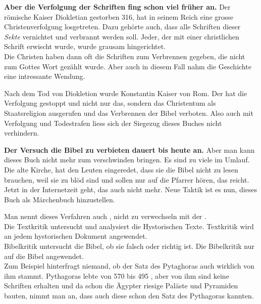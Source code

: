 \documentclass[fontsize=16pt]{mybib}
\begin{document}
\begin{otsblock}

    \textbf{Aber die Verfolgung der Schriften fing schon viel früher an.} Der römische Kaiser Diokletian gestorben 316, hat in seinem Reich eine grosse Christenverfolgung losgetreten. Dazu gehörte auch, dass alle Schriften dieser \textit{Sekte} vernichtet und verbrannt werden soll. Jeder, der mit einer christlichen Schrift erwischt wurde, wurde grausam hingerichtet. \\
    Die Christen haben dann oft die Schriften zum Verbrennen gegeben, die nicht zum Gottes Wort gezählt wurde. Aber auch in diesem Fall nahm die Geschichte eine intressante Wendung.

    Nach dem Tod von Diokletion wurde Konstantin Kaiser von Rom. Der hat die Verfolgung gestoppt und nicht nur das, sondern das Christentum als Staatsreligion ausgerufen und das Verbrennen der Bibel verboten. Also auch mit Verfolgung und Todestrafen liess sich der Siegezug dieses Buches nicht verhindern.\\
\end{otsblock}
\begin{otsblock}
    \textbf{Der Versuch die Bibel zu verbieten dauert bis heute an.} Aber man kann dieses Buch nicht mehr zum verschwinden bringen. Es sind zu viele im Umlauf. Die alte Kirche, hat den Leuten eingeredet, dass sie die Bibel nicht zu lesen brauchen, weil sie zu blöd sind und sollen nur auf die Pfarrer hören, das reicht.\\
    Jetzt in der Internetzeit geht, das auch nicht mehr. Neue Taktik ist es nun, dieses Buch als Märchenbuch hinzustellen.
    
    Man nennt dieses Verfahren auch , nicht zu verwechseln mit der .\\
    Die Textkritik untersucht und analysiert die Hystorischen Texte. Textkritik wird an jedem hystorischen Dokument angewendet.\\
    Bibelkritik untersucht die Bibel, ob sie falsch oder richtig ist. Die Bibelkritik nur auf die Bibel angewendet.\\
    Zum Beispiel hinterfragt niemand, ob der Satz des Pytaghoras auch wirklich von ihm stammt. Pythagoras lebte von 570 bis 495 \vChr, aber von ihm sind keine Schriften erhalten und da schon die Ägypter riesige Paläste und Pyramiden bauten, nimmt man an, dass auch diese schon den Satz des Pythagoras kannten.
   
\end{otsblock}
\end{document}
